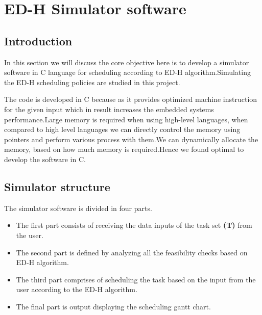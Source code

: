 \documentclass[12pt,hidelinks]{article}
\begin{document}
{\newpage

\section{ED-H Simulator software}
\vspace{4cm}
\subsection{Introduction}
In this section we will discuss the core objective here is to develop a simulator software in C language for scheduling according to ED-H algorithm.Simulating the ED-H scheduling policies are studied in this project.\newline

The code is developed in C because as it provides optimized machine instruction for the given input which in result increases the embedded systems performance.Large memory is required when using high-level languages, when compared to high level languages we can directly control the memory using pointers and perform various process with them.We can dynamically allocate the memory, based on how much memory is required.Hence we found optimal to develop the software in C.


\subsection{Simulator structure}
The simulator software is divided in four parts. 
\begin{itemize}
    \item The first part consists of receiving the data  inputs of the task set \textbf{(T)} from the user.
    \item The second part is defined by analyzing all the feasibility checks based on ED-H algorithm.
    \item The third part comprises of scheduling the task based on the input from the user according to the ED-H algorithm.
    \item The final part is output displaying the scheduling gantt chart.
    \end{itemize}

}
\end{document}
